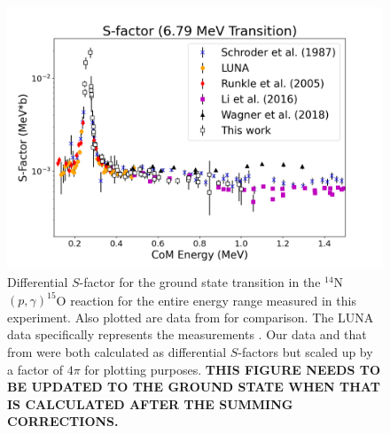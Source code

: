 \begin{figure}
		\includegraphics[width=1.0\linewidth]{figures/full679.png}
	\caption{Differential $S$-factor for the ground state transition in the $^{14}$N$\left( p,\gamma \right) ^{15}$O reaction for the entire energy range measured in this experiment. Also plotted are data from \cite{Schroder1987, Formicola2004, Imbriani2005, Runkle2005, Marta2008, Marta2011, Li2016, Wagner2018} for comparison. The LUNA data specifically represents the measurements \cite{Formicola2004, Imbriani2005, Marta2008, Marta2011}. Our data and that from \citet{Li2016} were both calculated as differential $S$-factors but scaled up by a factor of $4\pi$ for plotting purposes. \textbf{THIS FIGURE NEEDS TO BE UPDATED TO THE GROUND STATE WHEN THAT IS CALCULATED AFTER THE SUMMING CORRECTIONS.}}
	\label{fig: fullGS}
\end{figure}




